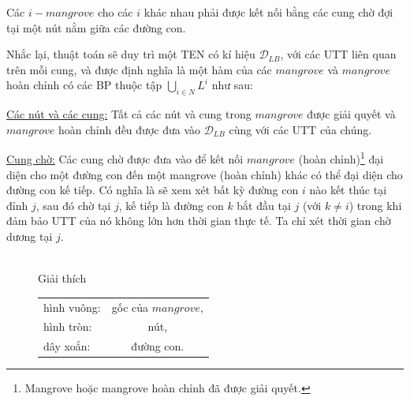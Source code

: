 \documentclass[../main.tex]{subfiles}
\begin{document}
Các \(i-mangrove\) cho các \(i\) khác nhau phải được kết nối bằng các
cung chờ đợi tại một nút nằm giữa các đường con.

Nhắc lại, thuật toán sẽ duy trì một TEN có kí hiệu \(\mathcal D_{LB}\),
với các UTT liên quan trên mỗi cung, và được định nghĩa là một hàm của
các \(mangrove\) và \(mangrove\) hoàn chỉnh có các BP thuộc tập
\(\bigcup _{i\in N} L^i\) như sau:

\underline{Các nút và các cung:} Tất cả các nút và cung trong \(mangrove\) được giải
quyết và \(mangrove\) hoàn chỉnh đều được đưa vào \(\mathcal D_{LB}\)
cùng với các UTT của chúng.

\underline{Cung chờ:} Các cung chờ được đưa vào để kết nối \(mangrove\) (hoàn
chỉnh)\footnote{Mangrove hoặc mangrove hoàn chỉnh đã được giải quyết.}
đại diện cho một đường con đến một mangrove (hoàn chỉnh) khác có thể đại
diện cho đường con kế tiếp. Có nghĩa là sẽ xem xét bất kỳ đường con
\(i\) nào kết thúc tại đỉnh \(j\), sau đó chờ tại \(j\), kế tiếp là
đường con \(k\) bắt đầu tại \(j\) (với \(k\neq i\)) trong khi đảm bảo
UTT của nó không lớn hơn thời gian thực tế. Ta chỉ xét thời gian chờ
dương tại \(j\).


\begin{figure}[H]
    \centering
    \\
    Giải thích \\

    \flushleft

    \begin{tabular}{lc}
      hình vuông: & gốc của \(mangrove\),\\ 
      hình tròn: & nút, \\
      dây xoắn: & đường con.      
    \end{tabular}
\end{figure}
\end{document}
